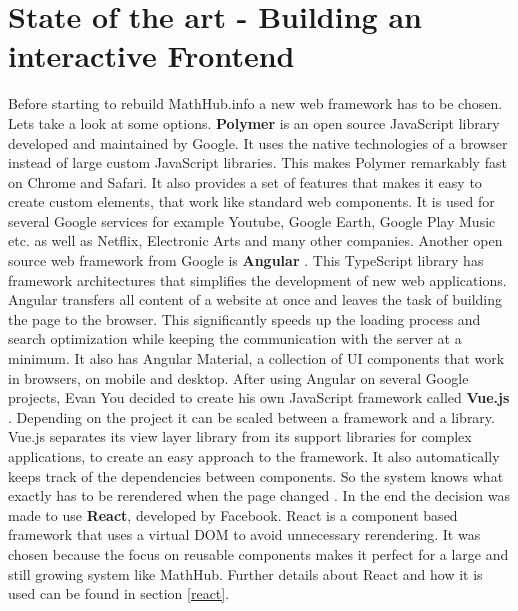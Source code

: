 \documentclass[11pt,a4paper]{article}
\begin{document}
\section{State of the art - Building an interactive Frontend} \label{SoA}
Before starting to rebuild MathHub.info a new web framework has to be chosen.
Lets take a look at some options.
\newline \newline
\textbf{Polymer} \cite{polymer} is an open source JavaScript library developed and maintained by Google.
It uses the native technologies of a browser instead of large custom JavaScript libraries.
This makes Polymer remarkably fast on Chrome and Safari.
It also provides a set of features that makes it easy to create custom elements, that work like standard web components.
It is used for several Google services for example Youtube, Google Earth, Google Play Music etc. as well as Netflix, Electronic Arts and many other companies. 
\newline \newline
Another open source web framework from Google is \textbf{Angular} \cite{angular}.
This TypeScript library has framework architectures that simplifies the development of new web applications.
Angular transfers all content of a website at once and leaves the task of building the page to the browser.
This significantly speeds up the loading process and search optimization while keeping the communication with the server at a minimum. 
It also has Angular Material, a collection of UI components that work in browsers, on mobile and desktop.
\newline \newline
After using Angular on several Google projects, Evan You decided to create his own JavaScript framework called \textbf{Vue.js} \cite{vuewiki}.
Depending on the project it can be scaled between a framework and a library.
Vue.js separates its view layer library from its support libraries for complex applications, to create an easy approach to the framework.
It also automatically keeps track of the dependencies between components.
So the system knows what exactly has to be rerendered when the page changed \cite{vuegit}.
\newline \newline
In the end the decision was made to use \textbf{React}, developed by Facebook.
React is a component based framework that uses a virtual DOM to avoid unnecessary rerendering.
It was chosen because the focus on reusable components makes it perfect for a large and still growing system like MathHub.
Further details about React and how it is used can be found in section \ref{react}.
\end{document}

